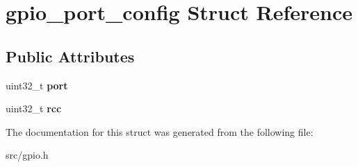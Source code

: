 \hypertarget{structgpio__port__config}{}\section{gpio\+\_\+port\+\_\+config Struct Reference}
\label{structgpio__port__config}
\subsection*{Public Attributes}
\begin{DoxyCompactItemize}
\item 
\hypertarget{structgpio__port__config_a37f5f40d14a183161a8dd4fd9ede9d05}{}uint32\+\_\+t {\bfseries port}\label{structgpio__port__config_a37f5f40d14a183161a8dd4fd9ede9d05}

\item 
\hypertarget{structgpio__port__config_a00cb058b3750f38e4b3c5be01e9b0f25}{}uint32\+\_\+t {\bfseries rcc}\label{structgpio__port__config_a00cb058b3750f38e4b3c5be01e9b0f25}

\end{DoxyCompactItemize}


The documentation for this struct was generated from the following file\+:\begin{DoxyCompactItemize}
\item 
src/gpio.\+h\end{DoxyCompactItemize}
